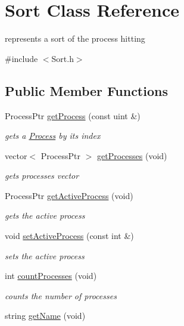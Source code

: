 \hypertarget{class_sort}{\section{\-Sort \-Class \-Reference}
\label{class_sort}
}


represents a sort of the process hitting  




{\ttfamily \#include $<$\-Sort.\-h$>$}

\subsection*{\-Public \-Member \-Functions}
\begin{DoxyCompactItemize}
\item 
\-Process\-Ptr \hyperlink{class_sort_a5b30c6e6f75987a8a10bef36762aace6}{get\-Process} (const uint \&)
\begin{DoxyCompactList}\small\item\em gets a \hyperlink{class_process}{\-Process} by its index \end{DoxyCompactList}\item 
\hypertarget{class_sort_a1b76cf03a033bdee33ddd783e6e61f29}{vector$<$ \-Process\-Ptr $>$ \hyperlink{class_sort_a1b76cf03a033bdee33ddd783e6e61f29}{get\-Processes} (void)}\label{class_sort_a1b76cf03a033bdee33ddd783e6e61f29}

\begin{DoxyCompactList}\small\item\em gets processes vector \end{DoxyCompactList}\item 
\hypertarget{class_sort_ad77072a25565d843de3ea6a7b47ffbdd}{\-Process\-Ptr \hyperlink{class_sort_ad77072a25565d843de3ea6a7b47ffbdd}{get\-Active\-Process} (void)}\label{class_sort_ad77072a25565d843de3ea6a7b47ffbdd}

\begin{DoxyCompactList}\small\item\em gets the active process \end{DoxyCompactList}\item 
\hypertarget{class_sort_afb60d6f4e0b2d2984faf33fe16ad29b2}{void \hyperlink{class_sort_afb60d6f4e0b2d2984faf33fe16ad29b2}{set\-Active\-Process} (const int \&)}\label{class_sort_afb60d6f4e0b2d2984faf33fe16ad29b2}

\begin{DoxyCompactList}\small\item\em sets the active process \end{DoxyCompactList}\item 
int \hyperlink{class_sort_a1f91b39f9d5d05ffbf59a1480102e85c}{count\-Processes} (void)
\begin{DoxyCompactList}\small\item\em counts the number of processes \end{DoxyCompactList}\item 
\hypertarget{class_sort_aae171b005c3dada51b7a302230ff501a}{string \hyperlink{class_sort_aae171b005c3dada51b7a302230ff501a}{get\-Name} (void)}\label{class_sort_aae171b005c3dada51b7a302230ff501a}


\end{DoxyCompactItemize}
